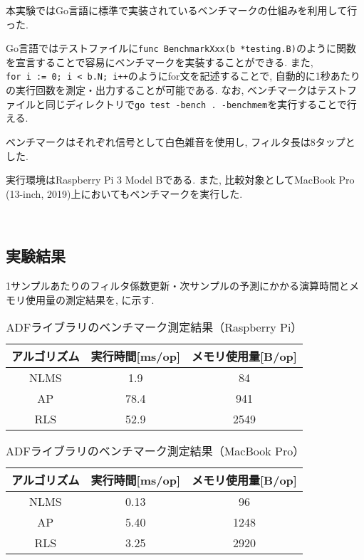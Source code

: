 本実験ではGo言語に標準で実装されているベンチマークの仕組みを利用して行った. 

Go言語ではテストファイルに\texttt{func\ BenchmarkXxx(b\ *testing.B)}のように関数を宣言することで容易にベンチマークを実装することができる. また, \texttt{for\ i\ :=\ 0;\ i\ \textless{}\ b.N;\ i++}のようにfor文を記述することで, 自動的に1秒あたりの実行回数を測定・出力することが可能である. なお, ベンチマークはテストファイルと同じディレクトリで\texttt{go\ test\ -bench\ .\ -benchmem}を実行することで行える. 


ベンチマークはそれぞれ信号として白色雑音を使用し, フィルタ長は8タップとした. 

実行環境はRaspberry Pi 3 Model Bである. また, 比較対象としてMacBook Pro (13-inch, 2019)上においてもベンチマークを実行した. 

\
\subsection{実験結果}\label{result-benchmark}

1サンプルあたりのフィルタ係数更新・次サンプルの予測にかかる演算時間とメモリ使用量の測定結果を, に示す. 

\begin{table}[H]
  \caption{ADFライブラリのベンチマーク測定結果（Raspberry Pi）}
  \label{tab:benchmark_raspi}
  \begin{tabular}{|c|c|c|}
  \hline
  アルゴリズム & 実行時間{[}ms/op{]} & メモリ使用量{[}B/op{]} \\ \hline
  NLMS   & 1.9             & 84               \\ \hline
  AP     & 78.4            & 941              \\ \hline
  RLS    & 52.9            & 2549             \\ \hline
  \end{tabular}
\end{table}

\begin{table}[H]
  \caption{ADFライブラリのベンチマーク測定結果（MacBook Pro）}
  \label{tab:benchmark_mac}
  \begin{tabular}{|c|c|c|}
  \hline
  アルゴリズム & 実行時間{[}ms/op{]} & メモリ使用量{[}B/op{]} \\ \hline
  NLMS   & 0.13            & 96               \\ \hline
  AP     & 5.40            & 1248             \\ \hline
  RLS    & 3.25            & 2920             \\ \hline
  \end{tabular}
\end{table}
\
